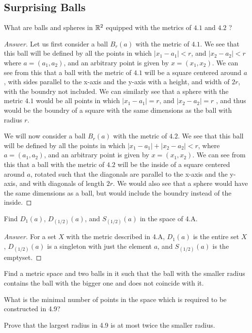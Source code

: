 \subsection{Surprising Balls}

\begin{minorEx}%
  What are balls and spheres in $\mathbb{R}^2$ equipped with the metrics
  of $4.1$ and $4.2$ ?
\end{minorEx}

\begin{proof}[Answer]
Let us first consider a ball $B_r(a)$ with the metric of $4.1$. We see that this
ball will be defined by all the points in which $|x_1-a_1|<r$,
and  $|x_2-a_2|<r$ where $a=(a_1,a_2)$, and an arbitrary point is given
by $x= (x_1,x_2)$. We can see from this that a ball with the metric of
$4.1$ will be a square centered around $a$, with sides parallel to
the x-axis and the y-axis with a height, and width
of $2r$, with the boundry not included. We can similarly see that a
sphere with the metric $4.1$ would be all points in which $|x_1-a_1|=r$,
and  $|x_2-a_2|=r$ , and thus would be the boundry of a square with
the same dimensions as the ball with radius $r$.

We will now consider a ball $B_r(a)$ with the metric of $4.2$. We see
that this ball will be defined by all the points in which 
$|x_1-a_1| + |x_2-a_2|<r$, where $a=(a_1,a_2)$, and
an arbitrary point is given by $x= (x_1,x_2)$. We can see from this
that a ball with the metric of $4.2$ will be the inside of a square centered around
$a$, rotated such that the diagonals are parallel to the x-axis and
the y-axis, and with diagonals of length $2r$. We would also see that
a sphere would have the same dimensions as a ball, but would include
the boundry instead of the inside.
\end{proof}

\begin{minorEx}%
Find $D_1(a)$, $D_(1/2)(a)$, and $S_(1/2)(a)$ in the space of 4.A.
\end{minorEx}
\begin{proof}[Answer]
For a set $X$ with the metric described in 4.A, $D_1(a)$ is the entire set $X$, $D_(1/2)(a)$ is a singleton with just the element $a$, and $S_(1/2)(a)$ is the emptyset.
\end{proof}

\begin{minorEx}
    Find a metric space and two balls in it such that the ball with the smaller
    radius contains the ball with the bigger one and does not coincide with it.
\end{minorEx}

\begin{minorEx}
    What is the minimal number of points in the space which is required to be
    constructed in 4.9?
\end{minorEx}

\begin{minorEx}
    Prove that the largest radius in 4.9 is at most twice the smaller radius.
\end{minorEx}
